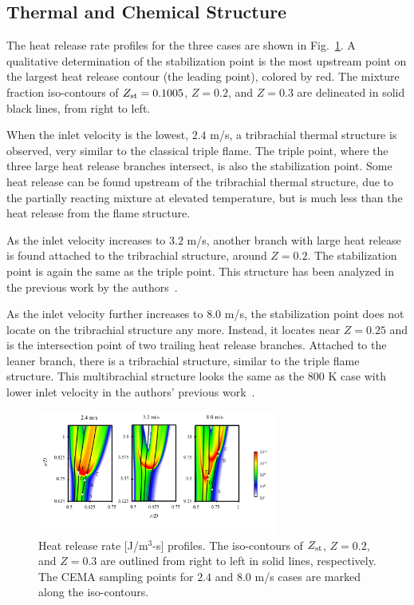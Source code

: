 \documentclass{wssci}
\begin{document}
\subsection{Thermal and Chemical Structure}  
The heat release rate profiles for the three cases are shown in Fig.~\ref{fig:HRR_V}.  A qualitative determination of the stabilization point is the most upstream point on the largest heat release contour (the leading point), colored by red.  The mixture fraction iso-contours of $Z_{\rm st} = 0.1005$, $Z = 0.2$, and $Z = 0.3$ are delineated in solid black lines, from right to left.

When the inlet velocity is the lowest, $2.4$ m/s, a tribrachial thermal structure is observed, very similar to the classical triple flame.  The triple point, where the three large heat release branches intersect, is also the stabilization point.  Some heat release can be found upstream of the tribrachial thermal structure, due to the partially reacting mixture at elevated temperature, but is much less than the heat release from the flame structure. 

As the inlet velocity increases to $3.2$ m/s, another branch with large heat release is found attached to the tribrachial structure, around $Z = 0.2$.  The stabilization point is again the same as the triple point.  This structure has been analyzed in the previous work by the authors~\cite{deng15}.

As the inlet velocity further increases to $8.0$ m/s, the stabilization point does not locate on the tribrachial structure any more.  Instead, it locates near $Z = 0.25$ and is the intersection point of two trailing heat release branches.  Attached to the leaner branch, there is a tribrachial structure, similar to the triple flame structure.  This multibrachial structure looks the same as the $800$ K case with lower inlet velocity in the authors' previous work~\cite{deng15}.

\begin{figure}
  \centering
  \scriptsize
  \vspace{-0.1in}
  \includegraphics[width=0.7\textwidth]{HRR_V.png}
  \normalsize
  \vspace{-0.4in}
  \caption{Heat release rate [J/m$^3$-s] profiles.  The iso-contours of $Z_{\rm st}$, $Z = 0.2$, and $Z = 0.3$ are outlined from right to left in solid lines, respectively.  The CEMA sampling points for $2.4$ and $8.0$ m/s cases are marked along the iso-contours.}
  \label{fig:HRR_V}
\end{figure}
\end{document}
